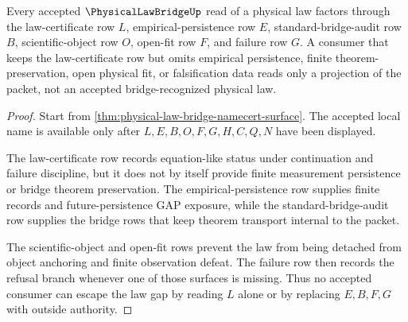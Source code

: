 \begin{theorem}
\label{thm:physical-law-bridge-law-gap-nonescape}
Every accepted $\PhysicalLawBridgeUp$ read of a physical law factors through the law-certificate row $L$, empirical-persistence row $E$, standard-bridge-audit row $B$, scientific-object row $O$, open-fit row $F$, and failure row $G$. A consumer that keeps the law-certificate row but omits empirical persistence, finite theorem-preservation, open physical fit, or falsification data reads only a projection of the packet, not an accepted bridge-recognized physical law.
\end{theorem}
\begin{proof}
Start from \autoref{thm:physical-law-bridge-namecert-surface}. The accepted local name is available only after $L,E,B,O,F,G,H,C,Q,N$ have been displayed.

The law-certificate row records equation-like status under continuation and failure discipline, but it does not by itself provide finite measurement persistence or bridge theorem preservation. The empirical-persistence row supplies finite records and future-persistence GAP exposure, while the standard-bridge-audit row supplies the bridge rows that keep theorem transport internal to the packet.

The scientific-object and open-fit rows prevent the law from being detached from object anchoring and finite observation defeat. The failure row then records the refusal branch whenever one of those surfaces is missing. Thus no accepted consumer can escape the law gap by reading $L$ alone or by replacing $E,B,F,G$ with outside authority.
\end{proof}

